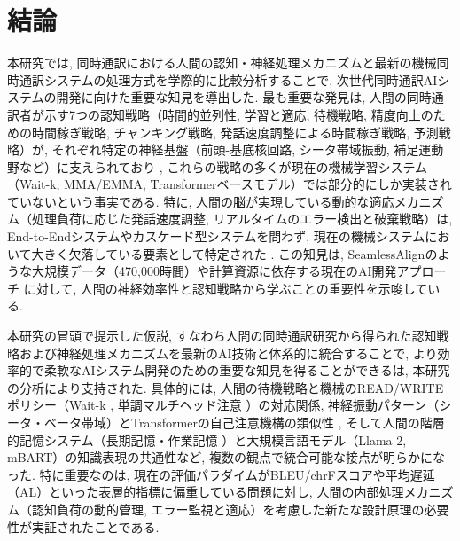 \section{結論}

本研究では, 同時通訳における人間の認知・神経処理メカニズムと最新の機械同時通訳システムの処理方式を学際的に比較分析することで, 次世代同時通訳AIシステムの開発に向けた重要な知見を導出した.
最も重要な発見は, 人間の同時通訳者が示す7つの認知戦略（時間的並列性, 学習と適応, 待機戦略, 精度向上のための時間稼ぎ戦略, チャンキング戦略, 発話速度調整による時間稼ぎ戦略, 予測戦略）が, それぞれ特定の神経基盤（前頭-基底核回路, シータ帯域振動, 補足運動野など）に支えられており \cite{hervais2015fmri,elmer2016functional,rinne2000left}, これらの戦略の多くが現在の機械学習システム（Wait-k, MMA/EMMA, Transformerベースモデル）では部分的にしか実装されていないという事実である.
特に, 人間の脳が実現している動的な適応メカニズム（処理負荷に応じた発話速度調整, リアルタイムのエラー検出と破棄戦略）は, End-to-Endシステムやカスケード型システムを問わず, 現在の機械システムにおいて大きく欠落している要素として特定された \cite{liu2024recent}.
この知見は, SeamlessAlignのような大規模データ（470,000時間）や計算資源に依存する現在のAI開発アプローチ \cite{barrault2023seamlessm4t} に対して, 人間の神経効率性と認知戦略から学ぶことの重要性を示唆している.

本研究の冒頭で提示した仮説, すなわち人間の同時通訳研究から得られた認知戦略および神経処理メカニズムを最新のAI技術と体系的に統合することで, より効率的で柔軟なAIシステム開発のための重要な知見を得ることができるは, 本研究の分析により支持された.
具体的には, 人間の待機戦略と機械のREAD/WRITEポリシー（Wait-k \cite{ma2019stacl}, 単調マルチヘッド注意 \cite{ma2020monotonic}）の対応関係, 神経振動パターン（シータ・ベータ帯域）とTransformerの自己注意機構の類似性 \cite{elmer2016functional}, そして人間の階層的記憶システム（長期記憶・作業記憶 \cite{baddeley2000episodic}）と大規模言語モデル（Llama 2, mBART）の知識表現の共通性など, 複数の観点で統合可能な接点が明らかになった.
特に重要なのは, 現在の評価パラダイムがBLEU/chrFスコアや平均遅延（AL）といった表層的指標に偏重している問題に対し, 人間の内部処理メカニズム（認知負荷の動的管理, エラー監視と適応）を考慮した新たな設計原理の必要性が実証されたことである.

